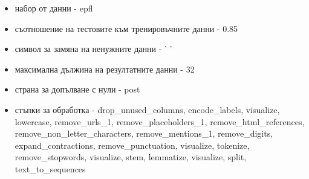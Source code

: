 \documentclass{article}
\begin{document}
\begin{itemize}
  \begin{itemize}
    \item набор от данни - epfl
    \item съотношение на тестовите към тренировъчните данни - 0.85
    \item символ за замяна на ненужните данни - ' '
    \item максимална дължина на резултатните данни - 32
    \item страна за допълване с нули - post
    \item стъпки за обработка - drop\_unused\_columns, encode\_labels, visualize, lowercase, remove\_urls\_1,
    remove\_placeholders\_1, remove\_html\_references, remove\_non\_letter\_characters, remove\_mentions\_1,
    remove\_digits, expand\_contractions, remove\_punctuation, visualize, tokenize, remove\_stopwords, visualize,
    stem, lemmatize, visualize, split, text\_to\_sequences
  \end{itemize}


\end{itemize}
\end{document}
